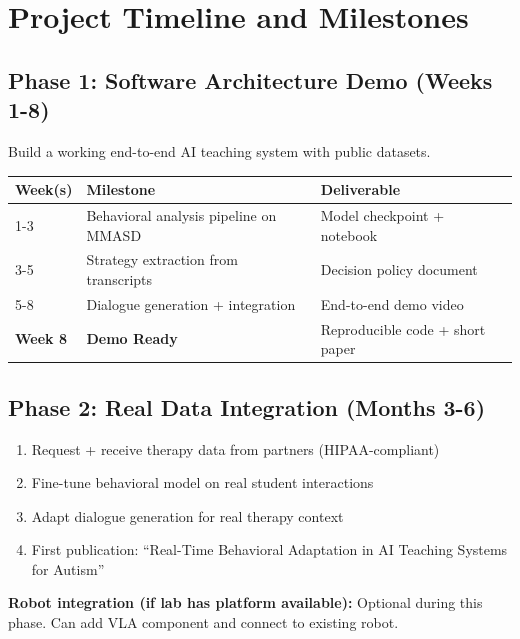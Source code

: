 \documentclass[12pt, a4paper]{article}
\begin{document}
\section{Project Timeline and Milestones}

\subsection{Phase 1: Software Architecture Demo (Weeks 1-8)}

Build a working end-to-end AI teaching system with public datasets.

\begin{center}
\begin{tabular}{|p{2cm}|p{6.5cm}|p{2.5cm}|}
\hline
\textbf{Week(s)} & \textbf{Milestone} & \textbf{Deliverable} \\
\hline
1-3 & Behavioral analysis pipeline on MMASD & Model checkpoint + notebook \\
\hline
3-5 & Strategy extraction from transcripts & Decision policy document \\
\hline
5-8 & Dialogue generation + integration & End-to-end demo video \\
\hline
\textbf{Week 8} & \textbf{Demo Ready} & Reproducible code + short paper \\
\hline
\end{tabular}
\end{center}

\subsection{Phase 2: Real Data Integration (Months 3-6)}

\begin{enumerate}
    \item Request + receive therapy data from partners (HIPAA-compliant)
    \item Fine-tune behavioral model on real student interactions
    \item Adapt dialogue generation for real therapy context
    \item First publication: ``Real-Time Behavioral Adaptation in AI Teaching Systems for Autism''
\end{enumerate}

\textbf{Robot integration (if lab has platform available):} Optional during this phase. Can add VLA component and connect to existing robot.
\end{document}
